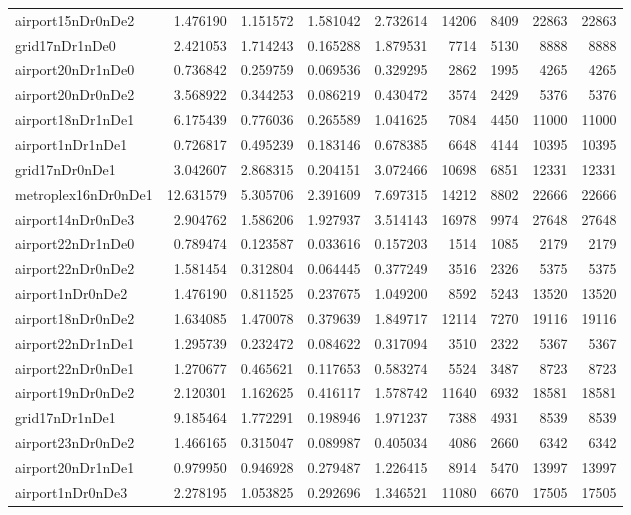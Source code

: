 \begin{longtable}{|l|r|r|r|r|r|r|r|r|}
airport15nDr0nDe2 & 1.476190 & 1.151572 & 1.581042 & 2.732614 & 14206 & 8409 & 22863 & 22863 \\
grid17nDr1nDe0 & 2.421053 & 1.714243 & 0.165288 & 1.879531 & 7714 & 5130 & 8888 & 8888 \\
airport20nDr1nDe0 & 0.736842 & 0.259759 & 0.069536 & 0.329295 & 2862 & 1995 & 4265 & 4265 \\
airport20nDr0nDe2 & 3.568922 & 0.344253 & 0.086219 & 0.430472 & 3574 & 2429 & 5376 & 5376 \\
airport18nDr1nDe1 & 6.175439 & 0.776036 & 0.265589 & 1.041625 & 7084 & 4450 & 11000 & 11000 \\
airport1nDr1nDe1 & 0.726817 & 0.495239 & 0.183146 & 0.678385 & 6648 & 4144 & 10395 & 10395 \\
grid17nDr0nDe1 & 3.042607 & 2.868315 & 0.204151 & 3.072466 & 10698 & 6851 & 12331 & 12331 \\
metroplex16nDr0nDe1 & 12.631579 & 5.305706 & 2.391609 & 7.697315 & 14212 & 8802 & 22666 & 22666 \\
airport14nDr0nDe3 & 2.904762 & 1.586206 & 1.927937 & 3.514143 & 16978 & 9974 & 27648 & 27648 \\
airport22nDr1nDe0 & 0.789474 & 0.123587 & 0.033616 & 0.157203 & 1514 & 1085 & 2179 & 2179 \\
airport22nDr0nDe2 & 1.581454 & 0.312804 & 0.064445 & 0.377249 & 3516 & 2326 & 5375 & 5375 \\
airport1nDr0nDe2 & 1.476190 & 0.811525 & 0.237675 & 1.049200 & 8592 & 5243 & 13520 & 13520 \\
airport18nDr0nDe2 & 1.634085 & 1.470078 & 0.379639 & 1.849717 & 12114 & 7270 & 19116 & 19116 \\
airport22nDr1nDe1 & 1.295739 & 0.232472 & 0.084622 & 0.317094 & 3510 & 2322 & 5367 & 5367 \\
airport22nDr0nDe1 & 1.270677 & 0.465621 & 0.117653 & 0.583274 & 5524 & 3487 & 8723 & 8723 \\
airport19nDr0nDe2 & 2.120301 & 1.162625 & 0.416117 & 1.578742 & 11640 & 6932 & 18581 & 18581 \\
grid17nDr1nDe1 & 9.185464 & 1.772291 & 0.198946 & 1.971237 & 7388 & 4931 & 8539 & 8539 \\
airport23nDr0nDe2 & 1.466165 & 0.315047 & 0.089987 & 0.405034 & 4086 & 2660 & 6342 & 6342 \\
airport20nDr1nDe1 & 0.979950 & 0.946928 & 0.279487 & 1.226415 & 8914 & 5470 & 13997 & 13997 \\
airport1nDr0nDe3 & 2.278195 & 1.053825 & 0.292696 & 1.346521 & 11080 & 6670 & 17505 & 17505 \\

\end{longtable}
